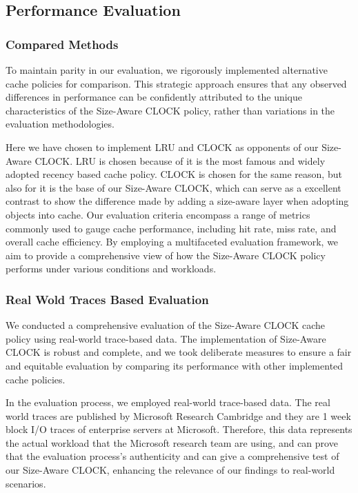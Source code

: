 \documentclass[conference]{IEEEtran}
\begin{document}
\subsection{Performance Evaluation}
\subsubsection{Compared Methods}
To maintain parity in our evaluation, we rigorously implemented alternative cache policies for comparison. This strategic approach ensures that any observed differences in performance can be confidently attributed to the unique characteristics of the Size-Aware CLOCK policy, rather than variations in the evaluation methodologies.

Here we have chosen to implement LRU and CLOCK as opponents of our Size-Aware CLOCK. LRU is chosen because of it is the most famous and widely adopted recency based cache policy. CLOCK is chosen for the same reason, but also for it is the base of our Size-Aware CLOCK, which can serve as a excellent contrast to show the difference made by adding a size-aware layer when adopting objects into cache. Our evaluation criteria encompass a range of metrics commonly used to gauge cache performance, including hit rate, miss rate, and overall cache efficiency. By employing a multifaceted evaluation framework, we aim to provide a comprehensive view of how the Size-Aware CLOCK policy performs under various conditions and workloads.

\subsubsection{Real Wold Traces Based Evaluation}
We conducted a comprehensive evaluation of the Size-Aware CLOCK cache policy using real-world trace-based data. The implementation of Size-Aware CLOCK is robust and complete, and we took deliberate measures to ensure a fair and equitable evaluation by comparing its performance with other implemented cache policies.

In the evaluation process, we employed real-world trace-based data. The real world traces are published by Microsoft Research Cambridge and they are 1 week block I/O traces of enterprise servers at Microsoft. Therefore, this data represents the actual workload that the Microsoft research team are using, and can prove that the evaluation process's authenticity and can give a comprehensive test of our Size-Aware CLOCK, enhancing the relevance of our findings to real-world scenarios.
\end{document}
